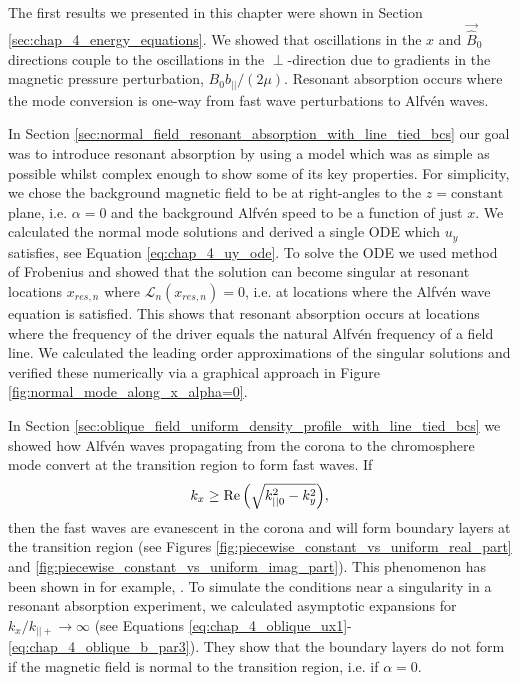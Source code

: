 The first results we presented in this chapter were shown in Section \ref{sec:chap_4_energy_equations}. We showed that oscillations in the $x$ and $\vec{\hat{B}}_0$ directions couple to the oscillations in the $\perp$-direction due to gradients in the magnetic pressure perturbation, $B_0b_{||}/(2\mu)$. Resonant absorption occurs where the mode conversion is one-way from fast wave perturbations to Alfv\'en waves. 

In Section \ref{sec:normal_field_resonant_absorption_with_line_tied_bcs} our goal was to introduce resonant absorption by using a model which was as simple as possible whilst complex enough to show some of its key properties. For simplicity, we chose the background magnetic field to be at right-angles to the $z=\text{constant}$ plane, i.e. $\alpha=0$ and the background Alfv\'en speed to be a function of just $x$. We calculated the normal mode solutions and derived a single ODE which $u_y$ satisfies, see Equation \eqref{eq:chap_4_uy_ode}. To solve the ODE we used method of Frobenius and showed that the solution can become singular at resonant locations $x_{res,n}$ where $\mathcal{L}_n(x_{res,n})=0$, i.e. at locations where the Alfv\'en wave equation is satisfied. This shows that resonant absorption occurs at locations where the frequency of the driver equals the natural Alfv\'en frequency of a field line. We calculated the leading order approximations of the singular solutions and verified these numerically via a graphical approach in Figure \ref{fig:normal_mode_along_x_alpha=0}.

In Section \ref{sec:oblique_field_uniform_density_profile_with_line_tied_bcs} we showed how Alfv\'en waves propagating from the corona to the chromosphere mode convert at the transition region to form fast waves. If
\[k_x \ge \Re\qty(\sqrt{k_{||0}^2 - k_y^2}),\]
then the fast waves are evanescent in the corona and will form boundary layers at the transition region (see Figures \ref{fig:piecewise_constant_vs_uniform_real_part} and \ref{fig:piecewise_constant_vs_uniform_imag_part}). This phenomenon has been shown in for example, \citet{Halberstadt1993,Halberstadt1995,Arregui2003}. 
To simulate the conditions near a singularity in a resonant absorption experiment, we calculated asymptotic expansions for $k_x/k_{||+} \rightarrow \infty$ (see Equations \ref{eq:chap_4_oblique_ux1}-\ref{eq:chap_4_oblique_b_par3}). They show that the boundary layers do not form if the magnetic field is normal to the transition region, i.e. if $\alpha=0$.

